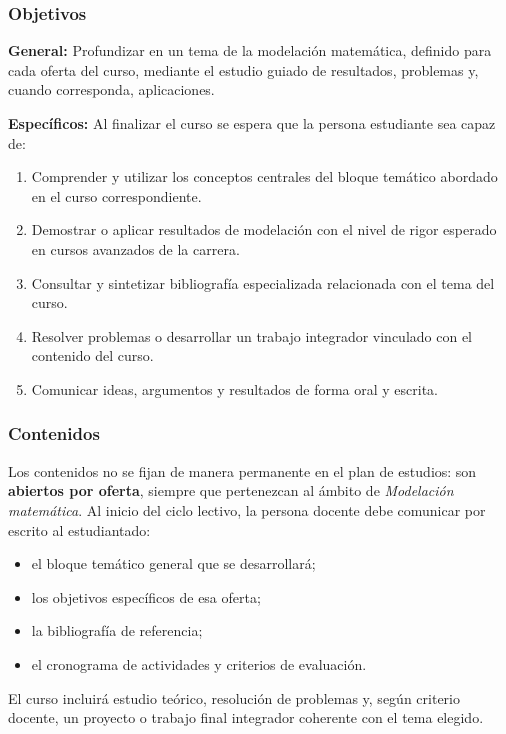 \begin{refsection}
\subsubsection*{Objetivos}

\textbf{General:} Profundizar en un tema de la modelación matemática, definido para cada oferta del curso, mediante el estudio guiado de resultados, problemas y, cuando corresponda, aplicaciones.

\textbf{Específicos:} Al finalizar el curso se espera que la persona estudiante sea capaz de:

\begin{enumerate}
\item Comprender y utilizar los conceptos centrales del bloque temático abordado en el curso correspondiente.
\item Demostrar o aplicar resultados de modelación con el nivel de rigor esperado en cursos avanzados de la carrera.
\item Consultar y sintetizar bibliografía especializada relacionada con el tema del curso.
\item Resolver problemas o desarrollar un trabajo integrador vinculado con el contenido del curso.
\item Comunicar ideas, argumentos y resultados de forma oral y escrita.
\end{enumerate}

\subsubsection*{Contenidos}

Los contenidos no se fijan de manera permanente en el plan de estudios: son \textbf{abiertos por oferta}, siempre que pertenezcan al ámbito de \emph{Modelación matemática}. Al inicio del ciclo lectivo, la persona docente debe comunicar por escrito al estudiantado:

\begin{itemize}
\item el bloque temático general que se desarrollará;
\item los objetivos específicos de esa oferta;
\item la bibliografía de referencia;
\item el cronograma de actividades y criterios de evaluación.
\end{itemize}

El curso incluirá estudio teórico, resolución de problemas y, según criterio docente, un proyecto o trabajo final integrador coherente con el tema elegido.


\end{refsection}
